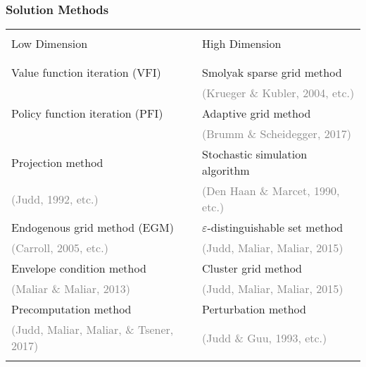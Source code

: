 \documentclass[xcolor=x11names,compress]{beamer}
\renewcommand{\(}{\begin{columns}}
\renewcommand{\)}{\end{columns}}
\newcommand{\<}[1]{\begin{column}{#1}}
\renewcommand{\>}{\end{column}}
\begin{document}
\begin{frame}
\frametitle{Solution Methods}
\begin{center}
\footnotesize
\begin{tabular}{p{5cm} | p{5cm}}
\hline
\\[-1.0em]
Low Dimension & High Dimension\\
\\[-1.0em]
\hline
\\[-0.7em]
Value function iteration (VFI) & Smolyak sparse grid method\\
& \hspace{0.1em} \textcolor{gray}{{\footnotesize (Krueger \& Kubler, 2004, etc.)}} \\
Policy function iteration (PFI) & Adaptive grid method \\
& \hspace{0.1em} \textcolor{gray}{{\footnotesize (Brumm \& Scheidegger, 2017)}} \\
Projection method & Stochastic simulation algorithm \\
 \hspace{0.1em} \textcolor{gray}{{\footnotesize (Judd, 1992, etc.)}} & \hspace{0.1em} \textcolor{gray}{{\footnotesize (Den Haan \& Marcet, 1990, etc.)}} \\
Endogenous grid method (EGM) & $\varepsilon$-distinguishable set method \\
\hspace{0.1em} \textcolor{gray}{{\footnotesize (Carroll, 2005, etc.)}} & \hspace{0.1em} \textcolor{gray}{{\footnotesize (Judd, Maliar, Maliar, 2015)}} \\
Envelope condition method & Cluster grid method \\
\hspace{0.1em} \textcolor{gray}{{\footnotesize (Maliar \& Maliar, 2013)}} & \hspace{0.1em} \textcolor{gray}{{\footnotesize (Judd, Maliar, Maliar, 2015)}} \\
Precomputation method & Perturbation method \\
\hspace{0.1em} \textcolor{gray}{{\footnotesize (Judd, Maliar, Maliar, \& Tsener, 2017)}} & \hspace{0.1em} \textcolor{gray}{{\footnotesize (Judd \& Guu, 1993, etc.)}}\\
[-0.7em]\\\hline
\end{tabular}
\end{center}

\end{frame}
\end{document}
